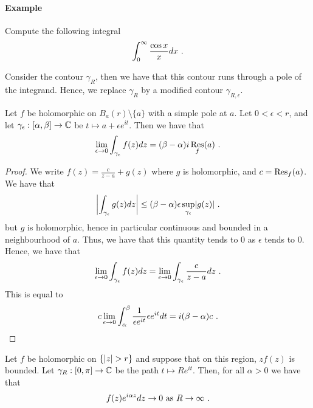 \paragraph{Example}
Compute the following integral
\[
\int_0^\infty \frac{\cos x}{x} dx \mpunct{.}
\]

Consider the contour $\gamma_{R}$, then we have that this contour runs through a pole of the integrand. Hence, we replace $\gamma_R$ by a modified contour $\gamma_{R, \epsilon}$.

\begin{lemma}
 Let $f$ be holomorphic on $B_a(r) \setminus \{ a \}$ with a simple pole at $a$.
 Let $0 < \epsilon < r$, and let $\gamma_\epsilon : [\alpha, \beta] \rightarrow \CC$ be $t \mapsto a + \epsilon e^{it}$.
 Then we have that
\[
\lim_{\epsilon \rightarrow 0} \int_{\gamma_\epsilon} f(z) dz = (\beta - \alpha)i \Res_f (a) \mpunct{.}
\]
\end{lemma}

\begin{proof}
  We write $f(z) = \frac{c}{z - a} + g(z)$ where $g$ is holomorphic, and $c = \Res_f (a)$.
  We have that
\[
\abs*{\int_{\gamma_\epsilon} g(z) dz} \leq (\beta - \alpha) \epsilon \sup_{\gamma_\epsilon} \abs{ g(z) } \mpunct{.}
\]
but $g$ is holomorphic, hence in particular continuous and bounded in a neighbourhood of $a$.
Thus, we have that this quantity tends to $0$ as $\epsilon$ tends to $0$.
Hence, we have that
\[
\lim_{\epsilon \rightarrow 0} \int_{\gamma_\epsilon} f(z) dz = \lim_{\epsilon \rightarrow 0} \int_{\gamma_\epsilon} \frac{c}{z - a} dz \mpunct{.}
\]
This is equal to
\[
c \lim_{\epsilon \rightarrow 0} \int_\alpha^\beta \frac{1}{\epsilon e^{i t}} \epsilon e^{i t} dt = i (\beta - \alpha) c \mpunct{.}
\]
\end{proof}

\begin{lemma}
 Let $f$ be holomorphic on $\{ \abs{z} > r \}$ and suppose that on this region, $z f(z)$ is bounded.
 Let $\gamma_R : [0, \pi] \rightarrow \CC$ be the path $t \mapsto R e^{i t}$.
 Then, for all $\alpha > 0$ we have that
\[
f(z) e^{i \alpha z} dz \rightarrow 0 \text{ as } R \rightarrow \infty \mpunct{.}
\]
\end{lemma}

